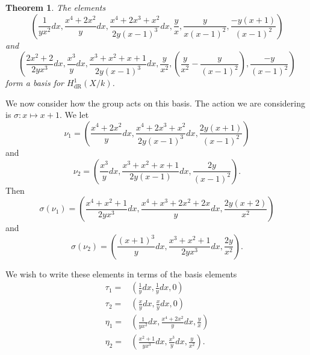 \documentclass[draft, 11pt]{article} %
\theoremstyle{plain}
\newtheorem{thm}[defn]{Theorem}
\theoremstyle{remark}
\newcommand{\derhamhone}{H_{\text {dR}}^1(X/k)}
\begin{document}
\begin{thm}
The elements
\[
\left( \frac{1}{yx^2}dx, \frac{x^4+2x^2}{y}dx, \frac{x^4 + 2x^3 + x^2}{2y(x-1)^3}dx, \frac{y}{x}, \frac{y}{x(x-1)^2}, \frac{-y(x+1)}{(x-1)^2} \right)
\]
and
\[
\left( \frac{2x^2 + 2}{2yx^3}dx, \frac{x^3}{y}dx, \frac{x^3 + x^2 + x + 1}{2y(x-1)^3}dx, \frac{y}{x^2}, \left( \frac{y}{x^2} - \frac{y}{(x-1)^2}\right), \frac{-y}{(x-1)^2}\right)
\]
form a basis for $\derhamhone$.
\end{thm}

We now consider how the group acts on this basis.
The action we are considering is $\sigma\colon x \mapsto x+1$.
We let 
\[
\nu_1 = \left( \frac{x^4 + 2x^2}{y}dx , \frac{x^4 + 2x^3 + x^2}{2y(x-1)^3}dx, \frac{2y(x+1)}{(x-1)^2} \right)
\]
and
\[
\nu_2 = \left( \frac{x^3}{y}dx, \frac{ x^3 + x^2 + x + 1}{2y(x-1)}dx, \frac{2y}{(x-1)^2} \right).
\]
Then
\[
\sigma(\nu_1) = \left( \frac{x^4+x^2+1}{2yx^3}dx, \frac{x^4 + x^3 + 2x^2 + 2x}{y}dx, \frac{2y(x+2)}{x^2} \right)
\]
and
\[
\sigma(\nu_2) = \left( \frac{(x+1)^3}{y}dx, \frac{x^3 + x^2 + 1}{2yx^3}dx, \frac{2y}{x^2} \right).
\]

We wish to write these elements in terms of the basis elements 
\begin{align*}
\tau_1 = & \left( \frac{1}{y}dx, \frac{1}{y}dx, 0 \right) \\
\tau_2 = & \left( \frac{x}{y}dx, \frac{x}{y}dx, 0 \right) \\
\eta_1 = & \left( \frac{1}{yx^2}dx, \frac{x^4 + 2x^2}{y}dx, \frac{y}{x} \right) \\
\eta_2 = & \left( \frac{x^2 + 1}{yx^3}dx, \frac{x^3}{y}dx, \frac{y}{x^2} \right).
\end{align*}





\end{document}
